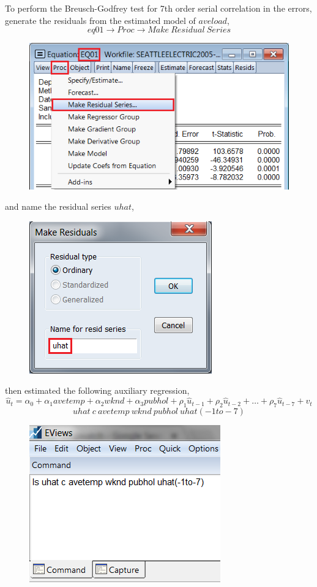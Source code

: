 \documentclass[12pt]{report}
\begin{document}
\noindent To perform the Breusch-Godfrey test for 7th order serial correlation in the errors, generate the residuals from the estimated model of $aveload$, $$eq01 \to Proc \to Make\ Residual\ Series$$
\begin{figure}[H]
	\centerline{\includegraphics{tute10_4}}
\end{figure}
\vspace{-\baselineskip} \noindent and name the residual series $uhat$,
\begin{figure}[H]
	\centerline{\includegraphics{tute10_5}}
\end{figure}
\vspace{-\baselineskip} \noindent then estimated the following auxiliary regression, $$\hat{u}_t = \alpha_0 + \alpha_1avetemp + \alpha_2wknd + \alpha_3pubhol + \rho_1\hat{u}_{t-1} + \rho_2\hat{u}_{t-2} + \dots + \rho_7\hat{u}_{t-7} + v_t$$ $$uhat\ c\ avetemp\ wknd\ pubhol\ uhat(-1to-7)$$ \begin{figure}[H]
	\centerline{\includegraphics{tute10_6}}
\end{figure}
\end{document}
